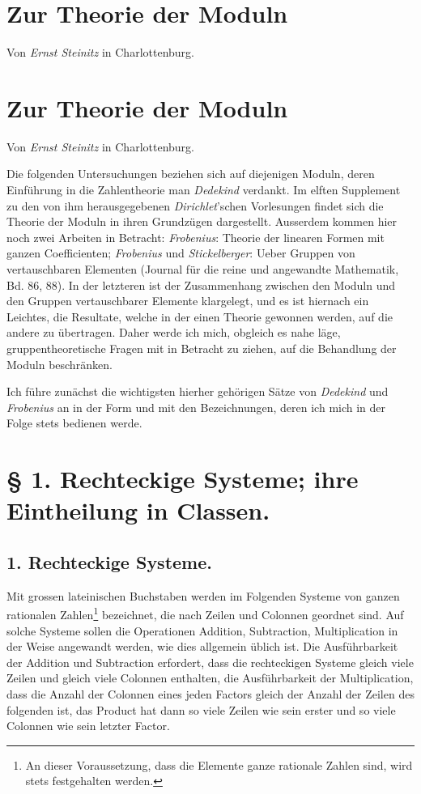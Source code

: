 \documentclass[11pt,a4paper]{article}
\begin{document}
\section*{Zur Theorie der Moduln}
\begin{center}
Von \emph{Ernst Steinitz} in Charlottenburg.
\end{center}
\section*{Zur Theorie der Moduln}
\begin{center}
Von \emph{Ernst Steinitz} in Charlottenburg.
\end{center}

Die folgenden Untersuchungen beziehen sich auf diejenigen Moduln, deren Einführung in die Zahlentheorie man \emph{Dedekind} verdankt. Im elften Supplement zu den von ihm herausgegebenen \emph{Dirichlet}'schen Vorlesungen findet sich die Theorie der Moduln in ihren Grundzügen dargestellt. Ausserdem kommen hier noch zwei Arbeiten in Betracht: \emph{Frobenius}: Theorie der linearen Formen mit ganzen Coefficienten; \emph{Frobenius} und \emph{Stickelberger}: Ueber Gruppen von vertauschbaren Elementen (Journal für die reine und angewandte Mathematik, Bd. 86, 88). In der letzteren ist der Zusammenhang zwischen den Moduln und den Gruppen vertauschbarer Elemente klargelegt, und es ist hiernach ein Leichtes, die Resultate, welche in der einen Theorie gewonnen werden, auf die andere zu übertragen. Daher werde ich mich, obgleich es nahe läge, gruppentheoretische Fragen mit in Betracht zu ziehen, auf die Behandlung der Moduln beschränken.

Ich führe zunächst die wichtigsten hierher gehörigen Sätze von \emph{Dedekind} und \emph{Frobenius} an in der Form und mit den Bezeichnungen, deren ich mich in der Folge stets bedienen werde.

\section*{§ 1. Rechteckige Systeme; ihre Eintheilung in Classen.}

\subsection*{1. Rechteckige Systeme.}

Mit grossen lateinischen Buchstaben werden im Folgenden Systeme von ganzen rationalen Zahlen\footnote{An dieser Voraussetzung, dass die Elemente ganze rationale Zahlen sind, wird stets festgehalten werden.} bezeichnet, die nach Zeilen und Colonnen geordnet sind. Auf solche Systeme sollen die Operationen Addition, Subtraction, Multiplication in der Weise angewandt werden, wie dies allgemein üblich ist. Die Ausführbarkeit der Addition und Subtraction erfordert, dass die rechteckigen Systeme gleich viele Zeilen und gleich viele Colonnen enthalten, die Ausführbarkeit der Multiplication, dass die Anzahl der Colonnen eines jeden Factors gleich der Anzahl der Zeilen des folgenden ist, das Product hat dann so viele Zeilen wie sein erster und so viele Colonnen wie sein letzter Factor.
\end{document}
